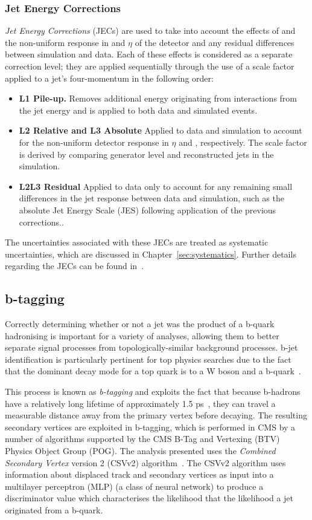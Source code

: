\subsubsection{Jet Energy Corrections}\label{subsubsec:JECs}
\emph{Jet Energy Corrections} (JECs) are used to take into account the effects of \PU and the non-uniform response in \pT and $\eta$ of the detector and any residual differences between simulation and data.
Each of these effects is considered as a separate correction level; they are applied sequentially through the use of a scale factor applied to a jet's four-momentum in the following order:

\begin{itemize}
\item \textbf{L1 Pile-up.} Removes additional energy originating from \PU interactions from the jet energy and is applied to both data and simulated events. 
\item \textbf{L2 Relative and L3 Absolute} Applied to data and simulation to account for the non-uniform detector response in $\eta$ and \pT, respectively. The scale factor is derived by comparing generator level and reconstructed jets in the simulation.
\item \textbf{L2L3 Residual} Applied to data only to account for any remaining small differences in the jet response between data and simulation, such as the absolute Jet Energy Scale (JES) following application of the previous corrections..
\end{itemize}

The uncertainties associated with these JECs are treated as systematic uncertainties, which are discussed in Chapter~\ref{sec:systematics}.
Further details regarding the JECs can be found in~\cite{Khachatryan:2016kdb}.

\subsection{b-tagging}\label{subsec:objReco-bJets}
Correctly determining whether or not a jet was the product of a b-quark hadronising is important for a variety of analyses, allowing them to better separate signal processes from topologically-similar background processes.
b-jet identification is particularly pertinent for top physics searches due to the fact that the dominant decay mode for a top quark is to a W boson and a b-quark~\cite{Tanabashi:2018oca}.

This process is known as \emph{b-tagging} and exploits the fact that because b-hadrons have a relatively long lifetime of approximately 1.5 ps~\cite{Beringer:1900zz}, they can travel a measurable distance away from the primary vertex before decaying. 
The resulting secondary vertices are exploited in b-tagging, which is performed in CMS by a number of algorithms supported by the CMS B-Tag and Vertexing (BTV) Physics Object Group (POG).
The analysis presented uses the \emph{Combined Secondary Vertex} version 2 (CSVv2) algorithm~\cite{Sirunyan:2017ezt}.
The CSVv2 algorithm uses information about displaced track and secondary vertices as input into a multilayer perceptron (MLP) (a class of neural network) to produce a discriminator value which characterises the likelihood that the likelihood a jet originated from a b-quark.

